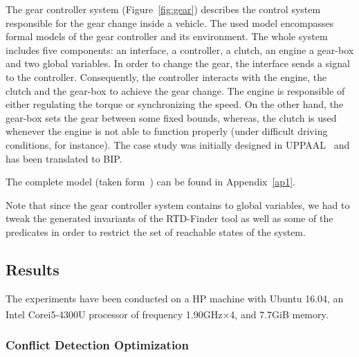 The gear controller system (Figure~\ref{fig:gear}) describes the control system responsible 
for the gear change inside a
vehicle. The used model encompasses formal models of the gear controller and its environment.
The whole system includes five components: an interface, a controller, a clutch, an engine a
gear-box and two global variables. In order to change the gear, the interface sends a signal to 
the controller. Consequently, the controller interacts with the engine, the clutch and the 
gear-box to achieve the gear change. The engine is responsible of either regulating the torque 
or synchronizing the speed. On the other hand, the gear-box sets the gear between some fixed 
bounds, whereas, the clutch is used whenever the engine is not able to function properly 
(under difficult driving conditions, for instance). 
The case study was initially designed in UPPAAL~\cite{gear} and has been translated to BIP.

The complete model (taken form~\cite{gear}) can be found in Appendix~\ref{ap1}.
\begin{remark}
Note that since the gear controller system contains to global variables, we had to tweak the 
generated invariants of the RTD-Finder tool as well as some of the predicates in order to 
restrict the set of reachable states of the system.
\end{remark}

\subsection{Results}
The experiments have been conducted on a HP machine with Ubuntu 16.04, an 
Intel\textsuperscript{\textregistered} Core\textsuperscript{\texttrademark}i5-4300U
processor of frequency 1.90GHz×4, and 7.7GiB memory.
\subsubsection{Conflict Detection Optimization}

